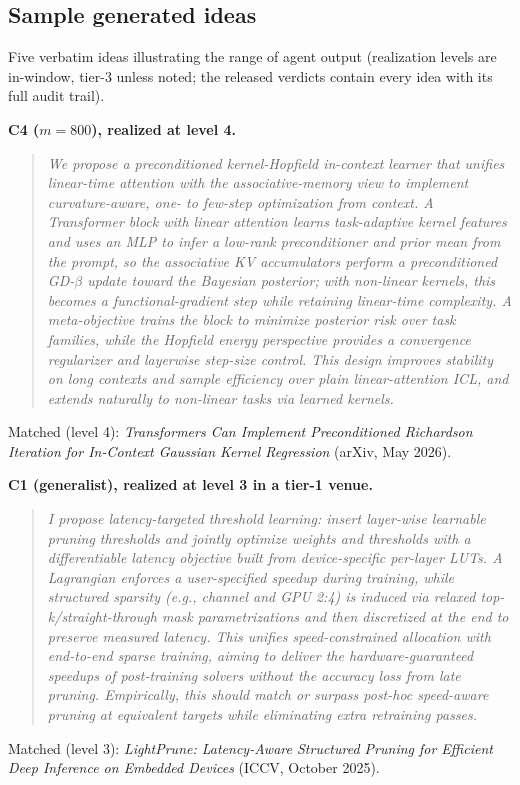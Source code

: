 \documentclass{article} %
\begin{document}
\subsection{Sample generated ideas}
\label{app:samples}

Five verbatim ideas illustrating the range of agent output (realization
levels are in-window, tier-3 unless noted; the released verdicts contain
every idea with its full audit trail).

\textbf{C4 ($m{=}800$), realized at level 4.}
\begin{quote}\small\itshape
We propose a preconditioned kernel-Hopfield in-context learner that unifies linear-time attention with the associative-memory view to implement curvature-aware, one- to few-step optimization from context. A Transformer block with linear attention learns task-adaptive kernel features and uses an MLP to infer a low-rank preconditioner and prior mean from the prompt, so the associative KV accumulators perform a preconditioned GD-$\beta$ update toward the Bayesian posterior; with non-linear kernels, this becomes a functional-gradient step while retaining linear-time complexity. A meta-objective trains the block to minimize posterior risk over task families, while the Hopfield energy perspective provides a convergence regularizer and layerwise step-size control. This design improves stability on long contexts and sample efficiency over plain linear-attention ICL, and extends naturally to non-linear tasks via learned kernels.
\end{quote}
Matched (level 4): \emph{Transformers Can Implement Preconditioned Richardson Iteration for In-Context Gaussian Kernel Regression} (arXiv, May 2026).

\textbf{C1 (generalist), realized at level 3 in a tier-1 venue.}
\begin{quote}\small\itshape
I propose latency-targeted threshold learning: insert layer-wise learnable pruning thresholds and jointly optimize weights and thresholds with a differentiable latency objective built from device-specific per-layer LUTs. A Lagrangian enforces a user-specified speedup during training, while structured sparsity (e.g., channel and GPU 2:4) is induced via relaxed top-k/straight-through mask parametrizations and then discretized at the end to preserve measured latency. This unifies speed-constrained allocation with end-to-end sparse training, aiming to deliver the hardware-guaranteed speedups of post-training solvers without the accuracy loss from late pruning. Empirically, this should match or surpass post-hoc speed-aware pruning at equivalent targets while eliminating extra retraining passes.
\end{quote}
Matched (level 3): \emph{LightPrune: Latency-Aware Structured Pruning for Efficient Deep Inference on Embedded Devices} (ICCV, October 2025).
\end{document}
